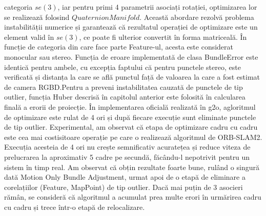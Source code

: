 \documentclass[12pt,a4paper]{report}
\begin{document}
categoria $ se(3) $, iar pentru primi 4 parametrii asociați rotației, optimizarea lor se realizează
folosind $ QuaternionManifold $. Această abordare rezolvă problema instabilității numerice și 
garantează că rezultatul operației de optimizare este un element valid în $ se(3) $, ce poate fi 
ulterior convertit în forma matriceală. În funcție de categoria din care face parte Feature-ul, 
acesta este considerat monocular sau stereo. Funcția de eroare implementată de clasa BundleError 
este identică pentru ambele, cu excepția faptului că pentru punctele stereo, este verificată și distanța 
la care se află punctul față de valoarea la care a fost estimat de camera RGBD.\@ Pentru a preveni
instabilitatea cauzată de punctele de tip outlier, funcția Huber descrisă în capitolul anterior este
folosită în calcularea finală a erorii de proiecție. În implementarea oficială realizată în g2o, 
agloritmul de optimizare este rulat de 4 ori și după fiecare execuție sunt eliminate punctele de tip 
outlier. Experimental, am observat că etapa de optimizare cadru cu cadru este cea mai costisitoare 
operație pe care o realizează algoritmul de ORB-SLAM2. Execuția acesteia de 4 ori nu crește 
semnificativ acuratețea și reduce viteza de prelucrarea la aproximativ 5 cadre pe secundă, făcându-l 
nepotrivit pentru un sistem în timp real. Am observat că obțin rezultate foarte bune, rulând o singură
dată Motion Only Bundle Adjustment, urmat apoi de o etapă de eliminare a corelațiilor 
(Feature, MapPoint) de tip outlier. Dacă mai puțin de 3 asocieri rămân, se consideră că algoritmul
a acumulat prea multe erori în urmărirea cadru cu cadru și trece într-o etapă de relocalizare. \\
\end{document}
